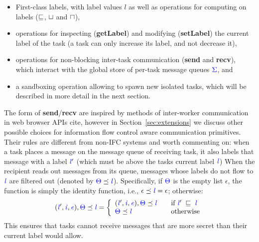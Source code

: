 \documentclass{sigplanconf}
\newcommand{\Varid}[1]{\mathit{#1}}
\newcommand{\Red}[1]{{\color{red} #1}}
\begin{document}
\begin{itemize}
    \item First-class labels, with label values $l$ as well as operations for computing on
labels (\ensuremath{\flows}, \ensuremath{\lub} and \ensuremath{\glb}),
    \item operations for inspecting (\textbf{getLabel}) and modifying (\textbf{setLabel}) the current label of the task (a task can only increase its label, and not decrease it),
    \item operations for non-blocking inter-task communication (\textbf{send} and \textbf{recv}),
        which interact with the global store of per-task message queues \ensuremath{\ifc{\Sigma}}, and
    \item a sandboxing operation allowing to spawn new
    isolated tasks, which will be described in more detail in the
    next section.
\end{itemize}

The form of \textbf{send}/\textbf{recv} are \Red{inspired by methods of inter-worker communication
in web browser APIs} \Red{cite}, however in Section~\ref{sec:extensions} we
discuss other possible choices for information flow control aware communication
primitives.  Their rules are different from non-IFC systems
and worth commenting on: when a task places
a message on the message queue of receiving task, it also labels that
message with a label \ensuremath{\ifc{\Varid{l}}'} (which must be above the tasks current label \ensuremath{\ifc{\Varid{l}}})
When the recipient reads out messages from its queue,
messages whose labels do not
flow to \ensuremath{\ifc{\Varid{l}}} are filtered out (denoted by \ensuremath{\ifc{\Theta}\preceq\ifc{\Varid{l}}}).
Specifically, if \ensuremath{\ifc{\Theta}} is the empty list \ensuremath{\epsilon}, the
function is simply the identity function, i.e.,
\ensuremath{\epsilon\preceq\ifc{\Varid{l}}\mathrel{=}\epsilon}; otherwise:
\[
\ensuremath{(\ifc{\Varid{l}}',\ifc{\Varid{i}},\ifc{\Varid{e}}),\ifc{\Theta}\preceq\ifc{\Varid{l}}} = \left\{
\begin{array}{l l}
\ensuremath{(\ifc{\Varid{l}}',\ifc{\Varid{i}},\ifc{\Varid{e}}),\ifc{\Theta}\preceq\ifc{\Varid{l}}} & \quad \text{if \ensuremath{\ifc{\Varid{l}}'\;\flows\;\ifc{\Varid{l}}}}\\
\ensuremath{\ifc{\Theta}\preceq\ifc{\Varid{l}}} & \quad \text{otherwise}
\end{array} \right.
\]
This ensures that tasks cannot receive messages that are more secret
than their current label would allow.
\end{document}
